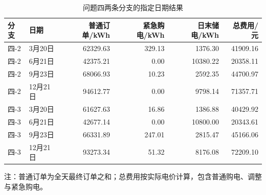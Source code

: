 \begin{table}[H]
\centering
\caption{问题四两条分支的指定日期结果}
\label{tab:q4_specified_dates}
\small
\setlength{\tabcolsep}{5pt}
\begin{tabular}{llrrrr}
\toprule
分支 & 日期 & 普通订单/kWh & 紧急购电/kWh & 日末储电/kWh & 总费用/元 \\
\midrule
四-2 & 3月20日 & 62329.63 & 329.13 & 1376.30 & 41909.16 \\
四-2 & 6月21日 & 42375.21 & 0.00 & 10380.22 & 20358.11 \\
四-2 & 9月23日 & 68066.93 & 10.23 & 2592.35 & 44700.97 \\
四-2 & 12月21日 & 94612.77 & 0.00 & 9798.14 & 71357.71 \\
\midrule
四-3 & 3月20日 & 61627.63 & 16.86 & 1386.88 & 40429.92 \\
四-3 & 6月21日 & 42677.14 & 0.00 & 10800.00 & 20343.61 \\
四-3 & 9月23日 & 66331.89 & 247.01 & 2815.47 & 45166.06 \\
四-3 & 12月21日 & 93273.34 & 51.32 & 8176.08 & 72209.10 \\
\bottomrule
\end{tabular}
\par\smallskip
\begin{minipage}{0.96\textwidth}
\small 注：普通订单为全天最终订单之和；总费用按实际电价计算，包含普通购电、调整与紧急购电。
\end{minipage}
\end{table}
